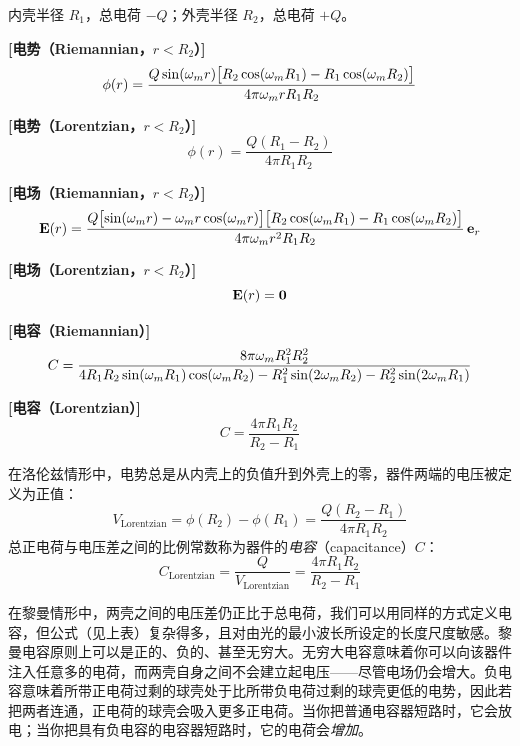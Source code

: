 \begin{keybox}[球形电容器]
内壳半径 $R_{1}$，总电荷 $-Q$；外壳半径 $R_{2}$，总电荷 $+Q$。

\textbf{[电势（Riemannian，$r<R_{2}$）]}
\begin{equation}
\phi(r) = \frac{Q\sin(\omega_m r)\bigl[R_{2}\cos(\omega_m R_{1}) - R_{1}\cos(\omega_m R_{2})\bigr]}{4\pi\omega_m r R_{1}R_{2}}
\end{equation}

\textbf{[电势（Lorentzian，$r<R_{2}$）]}
\begin{equation}
\phi(r) = \frac{Q(R_{1} - R_{2})}{4\pi R_{1}R_{2}}
\end{equation}

\textbf{[电场（Riemannian，$r<R_{2}$）]}
\begin{equation}
\mathbf{E}(r) = \frac{Q\bigl[\sin(\omega_m r) - \omega_m r\cos(\omega_m r)\bigr]
\bigl[R_{2}\cos(\omega_m R_{1}) - R_{1}\cos(\omega_m R_{2})\bigr]}{4\pi\omega_m r^{2}R_{1}R_{2}}\,\mathbf{e}_{r}
\end{equation}

\textbf{[电场（Lorentzian，$r<R_{2}$）]}
\begin{equation}
\mathbf{E}(r) = \mathbf{0}
\end{equation}

\textbf{[电容（Riemannian）]}
\begin{equation}
C = \frac{8\pi\omega_m R_{1}^{2}R_{2}^{2}}
{4R_{1}R_{2}\sin(\omega_m R_{1})\cos(\omega_m R_{2})
 - R_{1}^{2}\sin(2\omega_m R_{2}) - R_{2}^{2}\sin(2\omega_m R_{1})}
\end{equation}

\textbf{[电容（Lorentzian）]}
\begin{equation}
C = \frac{4\pi R_{1}R_{2}}{R_{2} - R_{1}}
\end{equation}
\end{keybox}


在洛伦兹情形中，电势总是从内壳上的负值升到外壳上的零，器件两端的电压被定义为正值：
\[
V_{\text{Lorentzian}} = \phi(R_{2}) - \phi(R_{1}) = \frac{Q(R_{2} - R_{1})}{4\pi R_{1}R_{2}}
\]
总正电荷与电压差之间的比例常数称为器件的\emph{电容}（capacitance）$C$：
\[
C_{\text{Lorentzian}} = \frac{Q}{V_{\text{Lorentzian}}} = \frac{4\pi R_{1}R_{2}}{R_{2} - R_{1}}
\]

在黎曼情形中，两壳之间的电压差仍正比于总电荷，我们可以用同样的方式定义电容，但公式（见上表）复杂得多，且对由光的最小波长所设定的长度尺度敏感。黎曼电容原则上可以是正的、负的、甚至无穷大。无穷大电容意味着你可以向该器件注入任意多的电荷，而两壳自身之间不会建立起电压——尽管电场仍会增大。负电容意味着所带正电荷过剩的球壳处于比所带负电荷过剩的球壳更低的电势，因此若把两者连通，正电荷的球壳会吸入更多正电荷。当你把普通电容器短路时，它会放电；当你把具有负电容的电容器短路时，它的电荷会\emph{增加}。

